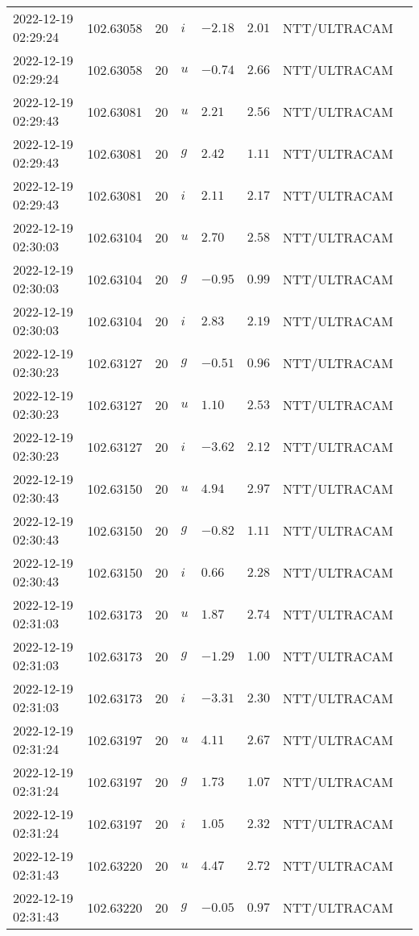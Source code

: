 \documentclass{nature_plusfigure}
\begin{document}
\begin{supplement}
\begin{center}
\begin{longtable}{llllllll}
2022-12-19 02:29:24 & 102.63058 & 20 & $i$ & $-2.18$ & $2.01$ & NTT/ULTRACAM &  \\ 
2022-12-19 02:29:24 & 102.63058 & 20 & $u$ & $-0.74$ & $2.66$ & NTT/ULTRACAM &  \\ 
2022-12-19 02:29:43 & 102.63081 & 20 & $u$ & $2.21$ & $2.56$ & NTT/ULTRACAM &  \\ 
2022-12-19 02:29:43 & 102.63081 & 20 & $g$ & $2.42$ & $1.11$ & NTT/ULTRACAM &  \\ 
2022-12-19 02:29:43 & 102.63081 & 20 & $i$ & $2.11$ & $2.17$ & NTT/ULTRACAM &  \\ 
2022-12-19 02:30:03 & 102.63104 & 20 & $u$ & $2.70$ & $2.58$ & NTT/ULTRACAM &  \\ 
2022-12-19 02:30:03 & 102.63104 & 20 & $g$ & $-0.95$ & $0.99$ & NTT/ULTRACAM &  \\ 
2022-12-19 02:30:03 & 102.63104 & 20 & $i$ & $2.83$ & $2.19$ & NTT/ULTRACAM &  \\ 
2022-12-19 02:30:23 & 102.63127 & 20 & $g$ & $-0.51$ & $0.96$ & NTT/ULTRACAM &  \\ 
2022-12-19 02:30:23 & 102.63127 & 20 & $u$ & $1.10$ & $2.53$ & NTT/ULTRACAM &  \\ 
2022-12-19 02:30:23 & 102.63127 & 20 & $i$ & $-3.62$ & $2.12$ & NTT/ULTRACAM &  \\ 
2022-12-19 02:30:43 & 102.63150 & 20 & $u$ & $4.94$ & $2.97$ & NTT/ULTRACAM &  \\ 
2022-12-19 02:30:43 & 102.63150 & 20 & $g$ & $-0.82$ & $1.11$ & NTT/ULTRACAM &  \\ 
2022-12-19 02:30:43 & 102.63150 & 20 & $i$ & $0.66$ & $2.28$ & NTT/ULTRACAM &  \\ 
2022-12-19 02:31:03 & 102.63173 & 20 & $u$ & $1.87$ & $2.74$ & NTT/ULTRACAM &  \\ 
2022-12-19 02:31:03 & 102.63173 & 20 & $g$ & $-1.29$ & $1.00$ & NTT/ULTRACAM &  \\ 
2022-12-19 02:31:03 & 102.63173 & 20 & $i$ & $-3.31$ & $2.30$ & NTT/ULTRACAM &  \\ 
2022-12-19 02:31:24 & 102.63197 & 20 & $u$ & $4.11$ & $2.67$ & NTT/ULTRACAM &  \\ 
2022-12-19 02:31:24 & 102.63197 & 20 & $g$ & $1.73$ & $1.07$ & NTT/ULTRACAM &  \\ 
2022-12-19 02:31:24 & 102.63197 & 20 & $i$ & $1.05$ & $2.32$ & NTT/ULTRACAM &  \\ 
2022-12-19 02:31:43 & 102.63220 & 20 & $u$ & $4.47$ & $2.72$ & NTT/ULTRACAM &  \\ 
2022-12-19 02:31:43 & 102.63220 & 20 & $g$ & $-0.05$ & $0.97$ & NTT/ULTRACAM &  \\ 

\end{longtable}
\end{center}
\end{supplement}
\end{document}
